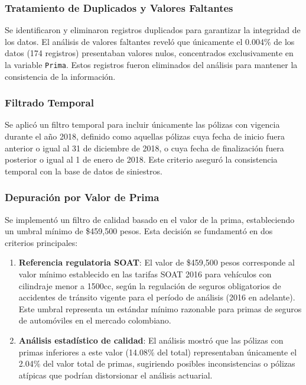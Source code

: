 \subsubsection{Tratamiento de Duplicados y Valores Faltantes}

Se identificaron y eliminaron registros duplicados para garantizar la integridad de los datos. El análisis de valores faltantes reveló que únicamente el 0.004\% de los datos (174 registros) presentaban valores nulos, concentrados exclusivamente en la variable \texttt{Prima}. Estos registros fueron eliminados del análisis para mantener la consistencia de la información.

\subsubsection{Filtrado Temporal}

Se aplicó un filtro temporal para incluir únicamente las pólizas con vigencia durante el año 2018, definido como aquellas pólizas cuya fecha de inicio fuera anterior o igual al 31 de diciembre de 2018, o cuya fecha de finalización fuera posterior o igual al 1 de enero de 2018. Este criterio aseguró la consistencia temporal con la base de datos de siniestros.

\subsubsection{Depuración por Valor de Prima}

Se implementó un filtro de calidad basado en el valor de la prima, estableciendo un umbral mínimo de \$459,500 pesos. Esta decisión se fundamentó en dos criterios principales:

\begin{enumerate}
    \item \textbf{Referencia regulatoria SOAT}: El valor de \$459,500 pesos corresponde al valor mínimo establecido en las tarifas SOAT 2016 para vehículos con cilindraje menor a 1500cc, según la regulación de seguros obligatorios de accidentes de tránsito vigente para el período de análisis (2016 en adelante). Este umbral representa un estándar mínimo razonable para primas de seguros de automóviles en el mercado colombiano.
    
    \item \textbf{Análisis estadístico de calidad}: El análisis mostró que las pólizas con primas inferiores a este valor (14.08\% del total) representaban únicamente el 2.04\% del valor total de primas, sugiriendo posibles inconsistencias o pólizas atípicas que podrían distorsionar el análisis actuarial.
\end{enumerate}

